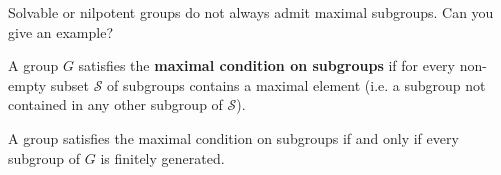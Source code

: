Solvable or nilpotent groups do not always admit maximal subgroups. Can you give an example?

\begin{definition}
A group $G$ satisfies the \textbf{maximal condition on subgroups} if
for every non-empty subset $\mathcal{S}$ of subgroups contains a maximal 
element (i.e. a subgroup not contained in any other subgroup of $\mathcal{S}$). 
\end{definition}


\begin{exercise}
\label{xca:MAX=fg}
A group satisfies the maximal condition on subgroups if and only if
every subgroup of $G$ is finitely generated. 
\end{exercise}



